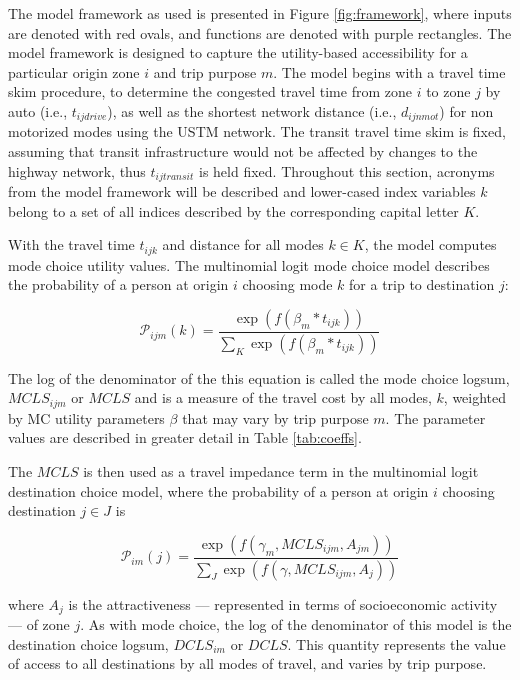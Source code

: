The model framework as used is presented in Figure \ref{fig:framework}, where
inputs are denoted with red ovals, and functions are denoted with purple rectangles.
The model framework is designed to capture the utility-based accessibility for
a particular origin zone \(i\) and trip purpose \(m\). The model begins with a
travel time skim procedure, to determine the congested travel time from zone
\(i\) to zone \(j\) by auto (i.e., \(t_{ijdrive}\)), as well as the shortest network distance (i.e., \(d_{ijnmot}\)) for non
motorized modes using the USTM network. The transit travel time skim is fixed, assuming that transit
infrastructure would not be affected by changes to the highway network, thus \(t_{ijtransit}\) is held fixed.
Throughout this section, acronyms from the model framework will be described and lower-cased index variables \(k\) belong to a set of
all indices described by the corresponding capital letter \(K\).

With the travel time \(t_{ijk}\) and distance for all modes \(k \in K\), the
model computes mode choice utility values. The multinomial logit mode choice
model describes the probability of a person at origin \(i\) choosing mode \(k\)
for a trip to destination \(j\):

\begin{equation}
\mathcal{P}_{ijm}(k) = \frac{\exp(f(\beta_m * t_{ijk}))}
{\sum_{K}\exp(f(\beta_m * t_{ijk}))}
  \label{eq:mcp}
\end{equation}

\noindent The log of the denominator of the this equation is called the
mode choice logsum, \(MCLS_{ijm}\) or \(MCLS\) and is a measure of the travel cost by
all modes, $k$, weighted by MC utility parameters \(\beta\) that may vary by
trip purpose $m$. The parameter values are described in greater detail in
Table \ref{tab:coeffs}.

The \(MCLS\) is then used as a travel impedance term in the multinomial
logit
destination choice model, where the probability of a person at origin \(i\)
choosing destination \(j \in J\) is

\begin{equation}
\mathcal{P}_{im}(j) = \frac{\exp(f(\gamma_m, MCLS_{ijm}, A_{jm}))}
{\sum_{J}\exp(f(\gamma, MCLS_{ijm}, A_j))}
  \label{eq:dcp}
\end{equation}

\noindent where \(A_j\) is the attractiveness --- represented in terms of
socioeconomic activity --- of zone \(j\). As with mode choice, the log of the
denominator of this model is the
destination choice logsum, \(DCLS_{im}\) or \(DCLS\). This quantity represents the value of access to
all destinations
by all modes of travel, and varies by trip purpose.

